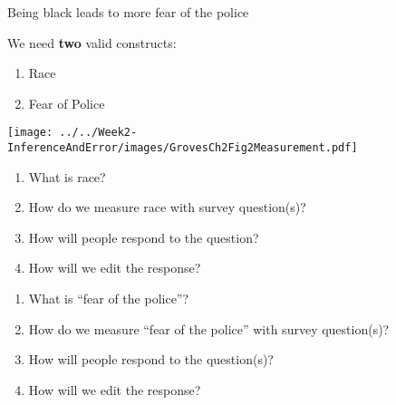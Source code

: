 \documentclass[]{beamer}
\begin{document}
\begin{frame}
\begin{center}
\begin{figure}[h!]
\end{figure}
\alert{Being black} leads to more \alert{fear of the police}
\end{center}
\end{frame}

\begin{frame}
We need \textbf{two} valid constructs:
\begin{enumerate}
\item Race
\item Fear of Police
\end{enumerate}
\end{frame}

\begin{frame}
\begin{center}
\texttt{[image: ../../Week2-InferenceAndError/images/GrovesCh2Fig2Measurement.pdf]}
\end{center}
\end{frame}

\begin{frame}
\begin{enumerate}
\item What is race? \pause
\item How do we measure race with survey question(s)? \pause
\item How will people respond to the question? \pause
\item How will we edit the response? 
\end{enumerate}
\end{frame}


\begin{frame}
\begin{enumerate}
\item What is ``fear of the police''? \pause
\item How do we measure ``fear of the police'' with survey question(s)? \pause
\item How will people respond to the question(s)? \pause
\item How will we edit the response? 
\end{enumerate}
\end{frame}
\end{document}

